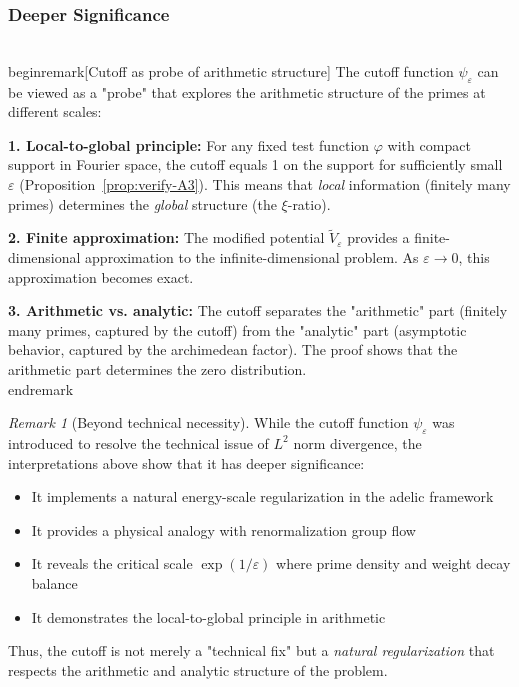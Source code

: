 ﻿\documentclass[12pt,a4paper]{article}
\theoremstyle{definition}
\theoremstyle{remark}
\newtheorem{remark}[theorem]{Remark}
\begin{document}
\subsubsection{Deeper Significance}

\\begin{remark}[Cutoff as probe of arithmetic structure]\label{interp:deeper}
The cutoff function $\psi_\varepsilon$ can be viewed as a "probe" that explores the arithmetic structure of the primes at different scales:

\textbf{1. Local-to-global principle:} For any fixed test function $\varphi$ with compact support in Fourier space, the cutoff equals 1 on the support for sufficiently small $\varepsilon$ (Proposition~\ref{prop:verify-A3}). This means that \emph{local} information (finitely many primes) determines the \emph{global} structure (the $\xi$-ratio).

\textbf{2. Finite approximation:} The modified potential $\widetilde{V}_\varepsilon$ provides a finite-dimensional approximation to the infinite-dimensional problem. As $\varepsilon \to 0$, this approximation becomes exact.

\textbf{3. Arithmetic vs. analytic:} The cutoff separates the "arithmetic" part (finitely many primes, captured by the cutoff) from the "analytic" part (asymptotic behavior, captured by the archimedean factor). The proof shows that the arithmetic part determines the zero distribution.
\\end{remark}

\begin{remark}[Beyond technical necessity]
While the cutoff function $\psi_\varepsilon$ was introduced to resolve the technical issue of $L^2$ norm divergence, the interpretations above show that it has deeper significance:
\begin{itemize}
\item It implements a natural energy-scale regularization in the adelic framework
\item It provides a physical analogy with renormalization group flow
\item It reveals the critical scale $\exp(1/\varepsilon)$ where prime density and weight decay balance
\item It demonstrates the local-to-global principle in arithmetic
\end{itemize}

Thus, the cutoff is not merely a "technical fix" but a \emph{natural regularization} that respects the arithmetic and analytic structure of the problem.
\end{remark}
\end{document}
